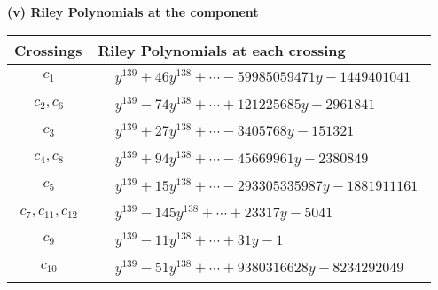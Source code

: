 \documentclass[1p]{elsarticle_modified}
\theoremstyle{definition}
\begin{document}
\newpage\renewcommand{\arraystretch}{1}
\flushleft \textbf{(v) Riley Polynomials at the component}\newline \\
\begin{tabular}{m{50pt}|m{274pt}}
Crossings & \hspace{64pt}Riley Polynomials at each crossing \\
\hline $$\begin{aligned}c_{1}\end{aligned}$$&$\begin{aligned}
&y^{139}+46 y^{138}+\cdots-59985059471 y-1449401041
\end{aligned}$\\
\hline $$\begin{aligned}c_{2},c_{6}\end{aligned}$$&$\begin{aligned}
&y^{139}-74 y^{138}+\cdots+121225685 y-2961841
\end{aligned}$\\
\hline $$\begin{aligned}c_{3}\end{aligned}$$&$\begin{aligned}
&y^{139}+27 y^{138}+\cdots-3405768 y-151321
\end{aligned}$\\
\hline $$\begin{aligned}c_{4},c_{8}\end{aligned}$$&$\begin{aligned}
&y^{139}+94 y^{138}+\cdots-45669961 y-2380849
\end{aligned}$\\
\hline $$\begin{aligned}c_{5}\end{aligned}$$&$\begin{aligned}
&y^{139}+15 y^{138}+\cdots-293305335987 y-1881911161
\end{aligned}$\\
\hline $$\begin{aligned}c_{7},c_{11},c_{12}\end{aligned}$$&$\begin{aligned}
&y^{139}-145 y^{138}+\cdots+23317 y-5041
\end{aligned}$\\
\hline $$\begin{aligned}c_{9}\end{aligned}$$&$\begin{aligned}
&y^{139}-11 y^{138}+\cdots+31 y-1
\end{aligned}$\\
\hline $$\begin{aligned}c_{10}\end{aligned}$$&$\begin{aligned}
&y^{139}-51 y^{138}+\cdots+9380316628 y-8234292049
\end{aligned}$\\
\hline
\end{tabular}\\~\\
\end{document}
